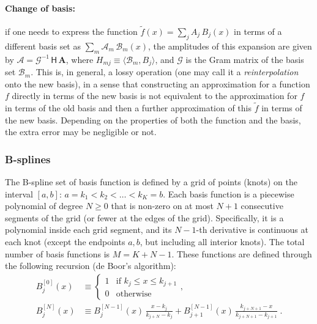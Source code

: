 \documentclass[12pt]{article}
\begin{document}
\paragraph{Change of basis:}  \label{sec:MathBasisSetChange}
if one needs to express the function $\tilde f(x) = \sum_j A_j\, B_j(x)$ in terms of a different basis set as $\sum_m \mathcal A_m\, \mathcal B_m(x)$, the amplitudes of this expansion are given by $\boldsymbol{\mathcal A} = \mathcal G^{-1}\, \mathsf H\, \boldsymbol A$, where $H_{mj} \equiv \langle \mathcal B_m, B_j \rangle$, and $\mathcal G$ is the Gram matrix of the basis set $\mathcal B_m$. This is, in general, a lossy operation (one may call it a \textit{reinterpolation} onto the new basis), in a sense that constructing an approximation for a function $f$ directly in terms of the new basis is not equivalent to the approximation for $f$ in terms of the old basis and then a further approximation of this $\tilde f$ in terms of the new basis. Depending on the properties of both the function and the basis, the extra error may be negligible or not.


\subsubsection{B-splines}  \label{sec:MathBSplineDetails}

The B-spline set of basis function is defined by a grid of points (knots) on the interval $[a,b]$: $a=k_1<k_2<\dots<k_K=b$. Each basis function is a piecewise polynomial of degree $N\ge 0$ that is non-zero on at most $N+1$ consecutive segments of the grid (or fewer at the edges of the grid). Specifically, it is a polynomial inside each grid segment, and its $N-1$-th derivative is continuous at each knot (except the endpoints $a,b$, but including all interior knots). The total number of basis functions is $M=K+N-1$. These functions are defined through the following recursion (de Boor's algorithm):
\begin{subequations}
\begin{align}
B^{[0]}_j(x) &\equiv \left\{ \begin{array}{ll} 1 &\mbox{if }k_j \le x \le k_{j+1} \\ 0 & \mbox{otherwise} \end{array} \right., \\
B^{[N]}_j(x) &\equiv B^{[N-1]}_j(x)\,\frac{x-k_j}{k_{j+N}-k_j} +
B^{[N-1]}_{j+1}(x)\,\frac{k_{j+N+1}-x}{k_{j+N+1}-k_{j+1}} \;.
\end{align}
\end{subequations}
\end{document}
